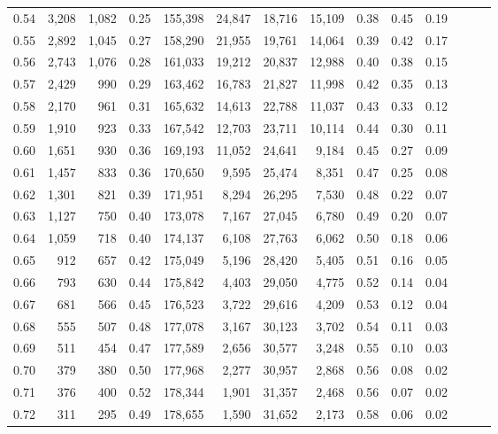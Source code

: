 \begin{tabular}{rrrrrrrrrrrrrr}
0.54 &  3,208 &  1,082 &  0.25 &  155,398 &   24,847 &  18,716 &  15,109 &  0.38 &  0.45 &      0.19 \\
0.55 &  2,892 &  1,045 &  0.27 &  158,290 &   21,955 &  19,761 &  14,064 &  0.39 &  0.42 &      0.17 \\
0.56 &  2,743 &  1,076 &  0.28 &  161,033 &   19,212 &  20,837 &  12,988 &  0.40 &  0.38 &      0.15 \\
0.57 &  2,429 &    990 &  0.29 &  163,462 &   16,783 &  21,827 &  11,998 &  0.42 &  0.35 &      0.13 \\
0.58 &  2,170 &    961 &  0.31 &  165,632 &   14,613 &  22,788 &  11,037 &  0.43 &  0.33 &      0.12 \\
0.59 &  1,910 &    923 &  0.33 &  167,542 &   12,703 &  23,711 &  10,114 &  0.44 &  0.30 &      0.11 \\
0.60 &  1,651 &    930 &  0.36 &  169,193 &   11,052 &  24,641 &   9,184 &  0.45 &  0.27 &      0.09 \\
0.61 &  1,457 &    833 &  0.36 &  170,650 &    9,595 &  25,474 &   8,351 &  0.47 &  0.25 &      0.08 \\
0.62 &  1,301 &    821 &  0.39 &  171,951 &    8,294 &  26,295 &   7,530 &  0.48 &  0.22 &      0.07 \\
0.63 &  1,127 &    750 &  0.40 &  173,078 &    7,167 &  27,045 &   6,780 &  0.49 &  0.20 &      0.07 \\
0.64 &  1,059 &    718 &  0.40 &  174,137 &    6,108 &  27,763 &   6,062 &  0.50 &  0.18 &      0.06 \\
0.65 &    912 &    657 &  0.42 &  175,049 &    5,196 &  28,420 &   5,405 &  0.51 &  0.16 &      0.05 \\
0.66 &    793 &    630 &  0.44 &  175,842 &    4,403 &  29,050 &   4,775 &  0.52 &  0.14 &      0.04 \\
0.67 &    681 &    566 &  0.45 &  176,523 &    3,722 &  29,616 &   4,209 &  0.53 &  0.12 &      0.04 \\
0.68 &    555 &    507 &  0.48 &  177,078 &    3,167 &  30,123 &   3,702 &  0.54 &  0.11 &      0.03 \\
0.69 &    511 &    454 &  0.47 &  177,589 &    2,656 &  30,577 &   3,248 &  0.55 &  0.10 &      0.03 \\
0.70 &    379 &    380 &  0.50 &  177,968 &    2,277 &  30,957 &   2,868 &  0.56 &  0.08 &      0.02 \\
0.71 &    376 &    400 &  0.52 &  178,344 &    1,901 &  31,357 &   2,468 &  0.56 &  0.07 &      0.02 \\
0.72 &    311 &    295 &  0.49 &  178,655 &    1,590 &  31,652 &   2,173 &  0.58 &  0.06 &      0.02 \\

\end{tabular}
